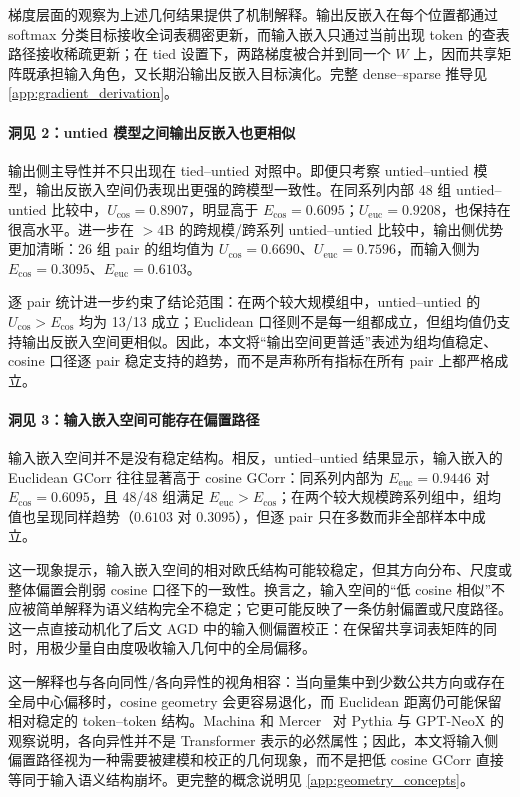 \documentclass{article}
\theoremstyle{plain}
\theoremstyle{definition}
\theoremstyle{remark}
\begin{document}
梯度层面的观察为上述几何结果提供了机制解释。输出反嵌入在每个位置都通过 softmax 分类目标接收全词表稠密更新，而输入嵌入只通过当前出现 token 的查表路径接收稀疏更新；在 tied 设置下，两路梯度被合并到同一个 $W$ 上，因而共享矩阵既承担输入角色，又长期沿输出反嵌入目标演化。完整 dense--sparse 推导见 \cref{app:gradient_derivation}。

\paragraph{洞见 2：untied 模型之间输出反嵌入也更相似}
输出侧主导性并不只出现在 tied--untied 对照中。即便只考察 untied--untied 模型，输出反嵌入空间仍表现出更强的跨模型一致性。在同系列内部 48 组 untied--untied 比较中，$U_{\mathrm{cos}}=0.8907$，明显高于 $E_{\mathrm{cos}}=0.6095$；$U_{\mathrm{euc}}=0.9208$，也保持在很高水平。进一步在 $>4$B 的跨规模/跨系列 untied--untied 比较中，输出侧优势更加清晰：26 组 pair 的组均值为 $U_{\mathrm{cos}}=0.6690$、$U_{\mathrm{euc}}=0.7596$，而输入侧为 $E_{\mathrm{cos}}=0.3095$、$E_{\mathrm{euc}}=0.6103$。

逐 pair 统计进一步约束了结论范围：在两个较大规模组中，untied--untied 的 $U_{\mathrm{cos}}>E_{\mathrm{cos}}$ 均为 13/13 成立；Euclidean 口径则不是每一组都成立，但组均值仍支持输出反嵌入空间更相似。因此，本文将“输出空间更普适”表述为组均值稳定、cosine 口径逐 pair 稳定支持的趋势，而不是声称所有指标在所有 pair 上都严格成立。


\paragraph{洞见 3：输入嵌入空间可能存在偏置路径}
输入嵌入空间并不是没有稳定结构。相反，untied--untied 结果显示，输入嵌入的 Euclidean GCorr 往往显著高于 cosine GCorr：同系列内部为 $E_{\mathrm{euc}}=0.9446$ 对 $E_{\mathrm{cos}}=0.6095$，且 48/48 组满足 $E_{\mathrm{euc}}>E_{\mathrm{cos}}$；在两个较大规模跨系列组中，组均值也呈现同样趋势（$0.6103$ 对 $0.3095$），但逐 pair 只在多数而非全部样本中成立。

这一现象提示，输入嵌入空间的相对欧氏结构可能较稳定，但其方向分布、尺度或整体偏置会削弱 cosine 口径下的一致性。换言之，输入空间的“低 cosine 相似”不应被简单解释为语义结构完全不稳定；它更可能反映了一条仿射偏置或尺度路径。这一点直接动机化了后文 AGD 中的输入侧偏置校正：在保留共享词表矩阵的同时，用极少量自由度吸收输入几何中的全局偏移。

这一解释也与各向同性/各向异性的视角相容：当向量集中到少数公共方向或存在全局中心偏移时，cosine geometry 会更容易退化，而 Euclidean 距离仍可能保留相对稳定的 token--token 结构。Machina 和 Mercer~\cite{machina2024anisotropy} 对 Pythia 与 GPT-NeoX 的观察说明，各向异性并不是 Transformer 表示的必然属性；因此，本文将输入侧偏置路径视为一种需要被建模和校正的几何现象，而不是把低 cosine GCorr 直接等同于输入语义结构崩坏。更完整的概念说明见 \cref{app:geometry_concepts}。
\end{document}
